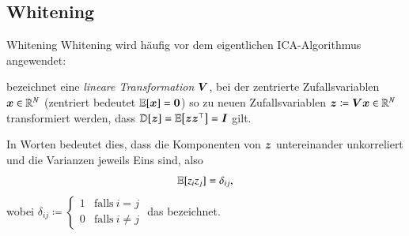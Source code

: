 \subsection{Whitening}

\begin{frame}{Whitening}{}
	Whitening wird häufig vor dem eigentlichen ICA-Algorithmus angewendet:
	\begin{mydef}
		 bezeichnet eine \textit{lineare Transformation} $\bm{V}$,
		bei der zentrierte Zufallsvariablen $\bm{x} \in \mathbb{R}^N$
		(zentriert bedeutet $\mathbb{E}[\bm{x}] = \bm{0}$) so zu neuen Zufallsvariablen $\bm{z} \coloneqq \bm{V} \bm{x} \in \mathbb{R}^N$ transformiert werden,
		dass $\mathbb{D}[\bm{z}] = \mathbb{E}\bigl[ \bm{z} \bm{z}^\top \bigr] = \bm{I}$ gilt.
	\end{mydef}

	In Worten bedeutet dies, dass die Komponenten von $\bm{z}$ untereinander unkorreliert und die Varianzen jeweils Eins sind,
	also $$\mathbb{E}[z_i z_j] = \delta_{ij},$$ wobei $\delta_{ij} \coloneqq
	\begin{cases} 1 & \text{falls}\ i = j \\ 0 & \text{falls}\ i \ne j \end{cases}$ das  bezeichnet.
\end{frame}


